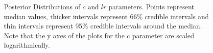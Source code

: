 \documentclass[
  12pt,
  letterpaper,
]{article}
\begin{document}
\begin{figure}


\caption{\label{fig-htw-post-dist}Posterior Distributions of \(c\) and
\(lr\) parameters. Points represent median values, thicker intervals
represent 66\% credible intervals and thin intervals represent 95\%
credible intervals around the median. Note that the y axes of the plots
for the c parameter are scaled logarithmically.}

\end{figure}%
\end{document}
